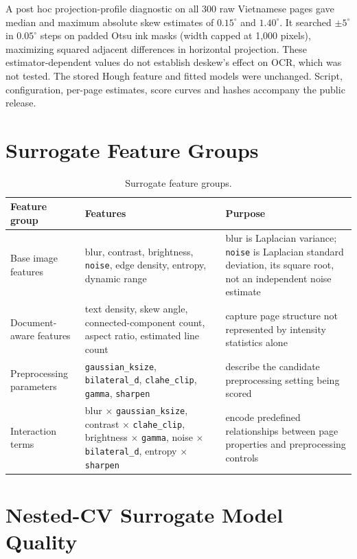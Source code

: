 \documentclass{article}
\begin{document}
A post hoc projection-profile diagnostic on all 300 raw Vietnamese pages gave median and maximum absolute skew estimates of $0.15^\circ$ and $1.40^\circ$. It searched $\pm5^\circ$ in $0.05^\circ$ steps on padded Otsu ink masks (width capped at 1,000 pixels), maximizing squared adjacent differences in horizontal projection. These estimator-dependent values do not establish deskew's effect on OCR, which was not tested. The stored Hough feature and fitted models were unchanged. Script, configuration, per-page estimates, score curves and hashes accompany the public release.

\section{Surrogate Feature Groups}

\begin{table}[h]
\centering
\caption{Surrogate feature groups.}
\begin{tabularx}{\textwidth}{p{3.0cm} p{6.2cm} X}
\toprule
Feature group & Features & Purpose \\
\midrule
Base image features & blur, contrast, brightness, \texttt{noise}, edge density, entropy, dynamic range & blur is Laplacian variance; \texttt{noise} is Laplacian standard deviation, its square root, not an independent noise estimate \\
Document-aware features & text density, skew angle, connected-component count, aspect ratio, estimated line count & capture page structure not represented by intensity statistics alone \\
Preprocessing parameters & \texttt{gaussian\_ksize}, \texttt{bilateral\_d}, \texttt{clahe\_clip}, \texttt{gamma}, \texttt{sharpen} & describe the candidate preprocessing setting being scored \\
Interaction terms & blur $\times$ \texttt{gaussian\_ksize}, contrast $\times$ \texttt{clahe\_clip}, brightness $\times$ \texttt{gamma}, noise $\times$ \texttt{bilateral\_d}, entropy $\times$ \texttt{sharpen} & encode predefined relationships between page properties and preprocessing controls \\
\bottomrule
\end{tabularx}
\end{table}

\section{Nested-CV Surrogate Model Quality}
\end{document}
